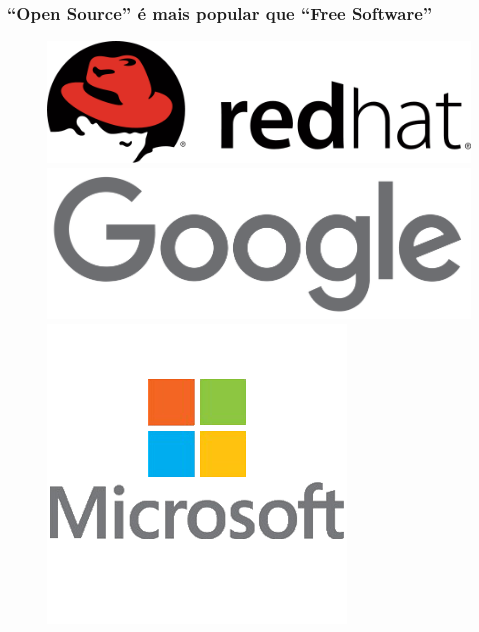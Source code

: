 \documentclass[xcolor=dvipsnames]{beamer}
\begin{document}
\begin{frame}
	\frametitle{``Open Source'' é mais popular que ``Free Software''}
	\begin{figure}
	\begin{center}
	\includegraphics[scale=0.20]{redhat.png}
	\includegraphics[scale=0.10]{google.png}
	\hspace{0.15cm}\includegraphics[scale=0.20]{microsoft.png} \\[0.3cm]

\end{center}
\end{figure}
\end{frame}
\end{document}

